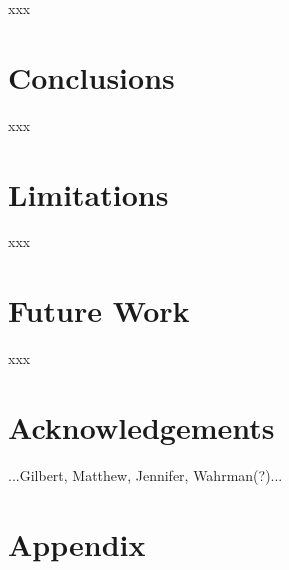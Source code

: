 \documentclass[letterpaper]{article}
\begin{document}
xxx
\par

\section{Conclusions}
\label{sec:Conclusions}

xxx
\par

\section{Limitations}
\label{sec:limitations}

xxx
\par

\section{Future Work}
\label{sec:future}

xxx
\par

\section{Acknowledgements}
\label{sec:ack}

...Gilbert, Matthew, Jennifer, Wahrman(?)...
\par







\appendix
\onecolumn
\section{Appendix}
\label{sec:appendix}
\end{document}
